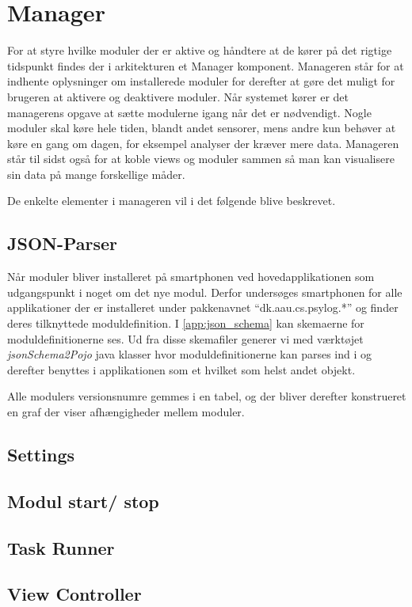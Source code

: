 \section{Manager}

For at styre hvilke moduler der er aktive og håndtere at de kører på det rigtige tidspunkt findes der i arkitekturen et Manager komponent.
Manageren står for at indhente oplysninger om installerede moduler for derefter at gøre det muligt for brugeren at aktivere og deaktivere moduler.
Når systemet kører er det managerens opgave at sætte modulerne igang når det er nødvendigt.
Nogle moduler skal køre hele tiden, blandt andet sensorer, mens andre kun behøver at køre en gang om dagen, for eksempel analyser der kræver mere data.
Manageren står til sidst også for at koble views og moduler sammen så man kan visualisere sin data på mange forskellige måder.

De enkelte elementer i manageren vil i det følgende blive beskrevet.

\subsection{JSON-Parser}

Når moduler bliver installeret på smartphonen ved hovedapplikationen som udgangspunkt i noget om det nye modul.
Derfor undersøges smartphonen for alle applikationer der er installeret under pakkenavnet ``dk.aau.cs.psylog.*'' og finder deres tilknyttede moduldefinition.
I \cref{app:json_schema} kan skemaerne for moduldefinitionerne ses.
Ud fra disse skemafiler generer vi med værktøjet \textit{jsonSchema2Pojo} \citep{jsonpojo} java klasser hvor moduldefinitionerne kan parses ind i og derefter benyttes i applikationen som et hvilket som helst andet objekt.


Alle modulers versionsnumre gemmes i en tabel, og der bliver derefter konstrueret en graf der viser afhængigheder mellem moduler.

\subsection{Settings}


\subsection{Modul start/ stop}

\subsection{Task Runner}

\subsection{View Controller}
